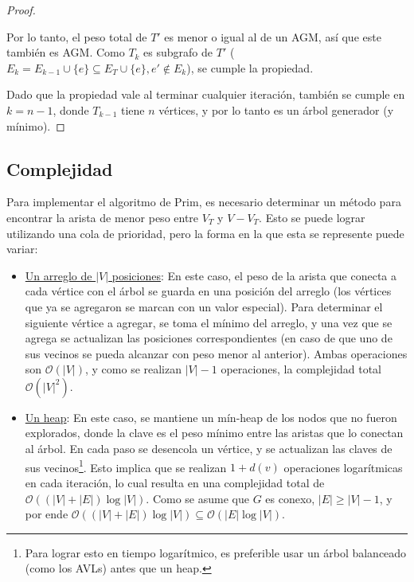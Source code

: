 \documentclass[a4paper]{report}
\newcommand{\BigO}[1]{\ensuremath{\mathcal{O}(#1)}}
\begin{document}
\begin{proof}
\begin{itemize}
              Por lo tanto, el peso total de $T'$ es menor o igual al de un AGM, así que este también es AGM. Como $T_k$ es subgrafo de $T'$ ($E_k = E_{k - 1} \cup \{e\} \subseteq E_T \cup \{e\}, e' \notin E_k$), se cumple la propiedad.
    \end{itemize}

    Dado que la propiedad vale al terminar cualquier iteración, también se cumple en $k = n - 1$, donde $T_{k - 1}$ tiene $n$ vértices, y por lo tanto es un árbol generador (y mínimo).

\end{proof}

\subsection{Complejidad}
\label{complejidad-prim}

Para implementar el algoritmo de Prim, es necesario determinar un método para encontrar la arista de menor peso entre $V_T$ y $V - V_T$. Esto se puede lograr utilizando una cola de prioridad, pero la forma en la que esta se represente puede variar:
\begin{itemize}
    \item \underline{Un arreglo de $|V|$ posiciones}: En este caso, el peso de la arista que conecta a cada vértice con el árbol se guarda en una posición del arreglo (los vértices que ya se agregaron se marcan con un valor especial). Para determinar el siguiente vértice a agregar, se toma el mínimo del arreglo, y una vez que se agrega se actualizan las posiciones correspondientes (en caso de que uno de sus vecinos se pueda alcanzar con peso menor al anterior). Ambas operaciones son \BigO{|V|}, y como se realizan $|V| - 1$ operaciones, la complejidad total \BigO{|V|^2}.
    \item \underline{Un heap}: En este caso, se mantiene un mín-heap de los nodos que no fueron explorados, donde la clave es el peso mínimo entre las aristas que lo conectan al árbol. En cada paso se desencola un vértice, y se actualizan las claves de sus vecinos\footnote{Para lograr esto en tiempo logarítmico, es preferible usar un árbol balanceado (como los AVLs) antes que un heap.}. Esto implica que se realizan $1 + d(v)$ operaciones logarítmicas en cada iteración, lo cual resulta en una complejidad total de \BigO{(|V| + |E|)\log{|V|}}. Como se asume que $G$ es conexo, $|E| \geq |V| - 1$, y por ende $\BigO{(|V| + |E|)\log{|V|}} \subseteq \BigO{|E|\log{|V|}}$.
\end{itemize}
\end{document}

